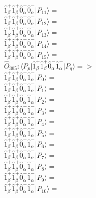 \documentclass[14pt]{article}
\begin{document}
    $ \hat{1}_{\beta}^{+}\hat{1}_{\beta}^{+}\hat{0}_{\alpha}^{-}\hat{0}_{\alpha}^{-} \vert{P_{11}}\rangle =  $ \\ 
    $ \hat{1}_{\beta}^{+}\hat{1}_{\beta}^{+}\hat{0}_{\alpha}^{-}\hat{0}_{\alpha}^{-} \vert{P_{12}}\rangle =  $ \\ 
    $ \hat{1}_{\beta}^{+}\hat{1}_{\beta}^{+}\hat{0}_{\alpha}^{-}\hat{0}_{\alpha}^{-} \vert{P_{13}}\rangle =  $ \\ 
    $ \hat{1}_{\beta}^{+}\hat{1}_{\beta}^{+}\hat{0}_{\alpha}^{-}\hat{0}_{\alpha}^{-} \vert{P_{14}}\rangle =  $ \\ 
    $ \hat{1}_{\beta}^{+}\hat{1}_{\beta}^{+}\hat{0}_{\alpha}^{-}\hat{0}_{\alpha}^{-} \vert{P_{15}}\rangle =  $ \\ 
    
    $\hat{O}_{305}:  \langle{P_p}\vert \hat{1}_{\beta}^{+}\hat{1}_{\beta}^{+}\hat{0}_{\alpha}^{-}\hat{1}_{\alpha}^{-} \vert{P_q}\rangle => $ \\ 
    $ \hat{1}_{\beta}^{+}\hat{1}_{\beta}^{+}\hat{0}_{\alpha}^{-}\hat{1}_{\alpha}^{-} \vert{P_{0}}\rangle =  $ \\ 
    $ \hat{1}_{\beta}^{+}\hat{1}_{\beta}^{+}\hat{0}_{\alpha}^{-}\hat{1}_{\alpha}^{-} \vert{P_{1}}\rangle =  $ \\ 
    $ \hat{1}_{\beta}^{+}\hat{1}_{\beta}^{+}\hat{0}_{\alpha}^{-}\hat{1}_{\alpha}^{-} \vert{P_{2}}\rangle =  $ \\ 
    $ \hat{1}_{\beta}^{+}\hat{1}_{\beta}^{+}\hat{0}_{\alpha}^{-}\hat{1}_{\alpha}^{-} \vert{P_{3}}\rangle =  $ \\ 
    $ \hat{1}_{\beta}^{+}\hat{1}_{\beta}^{+}\hat{0}_{\alpha}^{-}\hat{1}_{\alpha}^{-} \vert{P_{4}}\rangle =  $ \\ 
    $ \hat{1}_{\beta}^{+}\hat{1}_{\beta}^{+}\hat{0}_{\alpha}^{-}\hat{1}_{\alpha}^{-} \vert{P_{5}}\rangle =  $ \\ 
    $ \hat{1}_{\beta}^{+}\hat{1}_{\beta}^{+}\hat{0}_{\alpha}^{-}\hat{1}_{\alpha}^{-} \vert{P_{6}}\rangle =  $ \\ 
    $ \hat{1}_{\beta}^{+}\hat{1}_{\beta}^{+}\hat{0}_{\alpha}^{-}\hat{1}_{\alpha}^{-} \vert{P_{7}}\rangle =  $ \\ 
    $ \hat{1}_{\beta}^{+}\hat{1}_{\beta}^{+}\hat{0}_{\alpha}^{-}\hat{1}_{\alpha}^{-} \vert{P_{8}}\rangle =  $ \\ 
    $ \hat{1}_{\beta}^{+}\hat{1}_{\beta}^{+}\hat{0}_{\alpha}^{-}\hat{1}_{\alpha}^{-} \vert{P_{9}}\rangle =  $ \\ 
    $ \hat{1}_{\beta}^{+}\hat{1}_{\beta}^{+}\hat{0}_{\alpha}^{-}\hat{1}_{\alpha}^{-} \vert{P_{10}}\rangle =  $ \\ 
\end{document}
